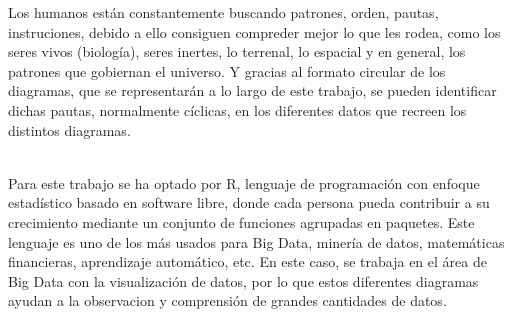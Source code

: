 \documentclass{article}\usepackage[]{graphicx}\usepackage[]{color}
\begin{document}
Los humanos est\'an constantemente buscando patrones, orden, pautas, instruciones, debido a ello consiguen compreder mejor lo que les rodea, como los seres vivos (biolog\'ia), seres inertes, lo terrenal, lo espacial y en general, los patrones que gobiernan el universo. Y gracias al formato circular de los diagramas, que se representar\'an a lo largo de este trabajo, se pueden identificar dichas pautas, normalmente c\'iclicas, en los diferentes datos que recreen los distintos diagramas.~\\~\par
Para este trabajo se ha optado por R\cite{R}, lenguaje de programaci\'on con enfoque estad\'istico basado en software libre, donde cada persona pueda contribuir a su crecimiento mediante un conjunto de funciones agrupadas en paquetes. Este lenguaje es uno de los m\'as usados para Big Data, miner\'ia de datos, matem\'aticas financieras, aprendizaje autom\'atico, etc. En este caso, se trabaja en el \'area de Big Data con la visualizaci\'on de datos, por lo que estos diferentes diagramas ayudan a la observacion y comprensi\'on de grandes cantidades de datos.
\clearpage
\end{document}
